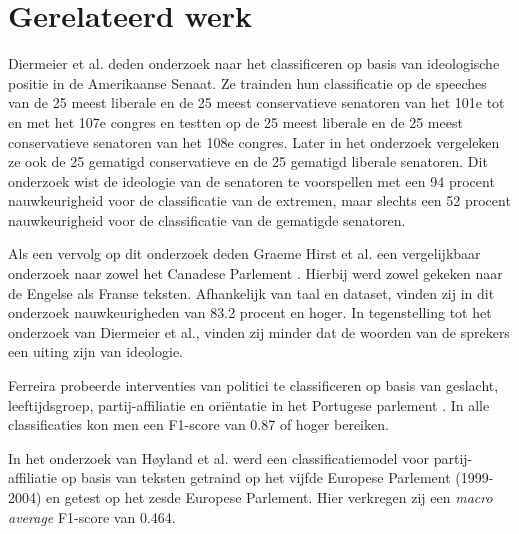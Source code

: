 \section{Gerelateerd werk}
\label{sec:rel}

Diermeier et al. deden onderzoek naar het classificeren op basis van ideologische positie in de Amerikaanse Senaat\cite{diermeier_godbout_yu_kaufmann_2012}. Ze trainden hun classificatie op de speeches van de 25 meest liberale en de 25 meest conservatieve senatoren van het 101e tot en met het 107e congres en testten op de 25 meest liberale en de 25 meest conservatieve senatoren van het 108e congres. Later in het onderzoek vergeleken ze ook de 25 gematigd conservatieve  en de 25 gematigd liberale senatoren.  Dit onderzoek wist de ideologie van de senatoren te voorspellen met een 94 procent nauwkeurigheid voor de classificatie van de extremen, maar slechts een 52 procent nauwkeurigheid voor de classificatie van de gematigde senatoren.\par

Als een vervolg op dit onderzoek deden Graeme Hirst et al. een vergelijkbaar onderzoek naar zowel het Canadese Parlement \cite{Hirst_textto}. Hierbij werd zowel gekeken naar de Engelse als Franse teksten. Afhankelijk van taal en dataset, vinden zij in dit onderzoek nauwkeurigheden van 83.2 procent en hoger. In tegenstelling tot het onderzoek van Diermeier et al., vinden zij minder dat de woorden van de sprekers een uiting zijn van ideologie. \par

Ferreira probeerde interventies van politici te classificeren op basis van geslacht, leeftijdsgroep, partij-affiliatie en ori\"{e}ntatie in het Portugese parlement \cite{Ferreira2016UsingTT}. In alle classificaties kon men een F1-score van 0.87 of hoger bereiken.\par
In het onderzoek van Høyland et al. werd een classificatiemodel voor partij-affiliatie op basis van teksten getraind op het vijfde Europese Parlement (1999-2004) en getest op het zesde Europese Parlement\cite{W14-2516}. Hier verkregen zij een \textit{macro average} F1-score van 0.464.\par

